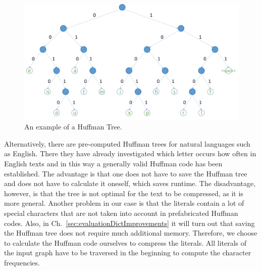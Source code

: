 \begin{figure}
	\centering
	\includegraphics[width=0.9\linewidth]{figures/4_rdf_specific_features/huffman}
	\caption{An example of a Huffman Tree.}
	\label{fig:huffmantree}
\end{figure}


Alternatively, there are pre-computed Huffman trees for natural languages such as English. There they have already investigated which letter occurs how often in English texts and in this way a generally valid Huffman code has been established. The advantage is that one does not have to save the Huffman tree and does not have to calculate it oneself, which saves runtime. The disadvantage, however, is that the tree is not optimal for the text to be compressed, as it is more general. Another problem in our case is that the literals contain a lot of special characters that are not taken into account in prefabricated Huffman codes. Also, in Ch.~\ref{sec:evaluationDictImprovements} it will turn out that saving the Huffman tree does not require much additional memory. Therefore, we choose to calculate the Huffman code ourselves to compress the literals. All literals of the input graph have to be traversed in the beginning to compute the character frequencies.




















